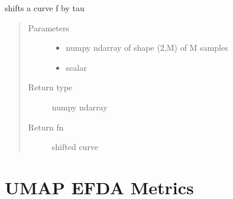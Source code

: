 \documentclass[letterpaper,10pt,english]{sphinxmanual}
\begin{document}

\begin{fulllineitems}
\label{\detokenize{curve_functions:curve_functions.shift_f}}
shifts a curve f by tau
\begin{quote}\begin{description}
\item[{Parameters}] \leavevmode\begin{itemize}
\item {} 
 \textendash{} numpy ndarray of shape (2,M) of M samples

\item {} 
 \textendash{} scalar

\end{itemize}

\item[{Return type}] \leavevmode
numpy ndarray

\item[{Return fn}] \leavevmode
shifted curve

\end{description}\end{quote}

\end{fulllineitems}



\chapter{UMAP EFDA Metrics}
\label{\detokenize{umap_metric:module-umap_metric}}\label{\detokenize{umap_metric:umap-efda-metrics}}\label{\detokenize{umap_metric::doc}}
\end{document}
